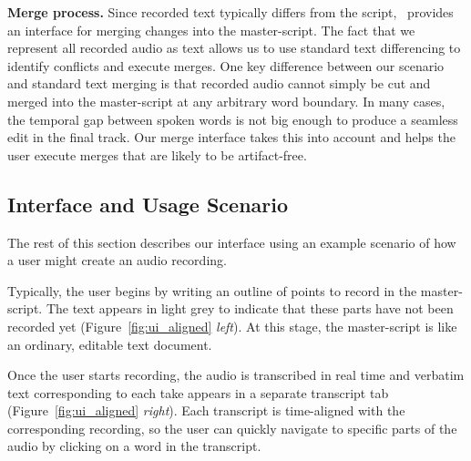\textbf{Merge process.} Since recorded text typically differs from the script, \systemname\ provides an interface for merging changes into the master-script. The fact that we represent all recorded audio as text allows us to use standard text differencing to identify conflicts and execute merges. One key difference between our scenario and standard text merging is that recorded audio cannot simply be cut and merged into the master-script at any arbitrary word boundary. In many cases, the temporal gap between spoken words is not big enough to produce a seamless edit in the final track. Our merge interface takes this into account and helps the user execute merges that are likely to be artifact-free.


\subsection{Interface and Usage Scenario}
The rest of this section describes our interface using an example scenario of how a user might create an audio recording. 

Typically, the user begins by writing an outline of points to record in the master-script.
The text appears in light grey to indicate that these parts have not been recorded yet (Figure~\ref{fig:ui_aligned} \textit{left}). At this stage, the master-script is like an ordinary, editable text document. 

Once the user starts recording, the audio is transcribed in real time and verbatim text corresponding to each take appears in a separate transcript tab (Figure~\ref{fig:ui_aligned} \textit{right}). Each transcript is time-aligned with the corresponding recording, so the user can quickly navigate to specific
parts of the audio by clicking on a word in the transcript. 

